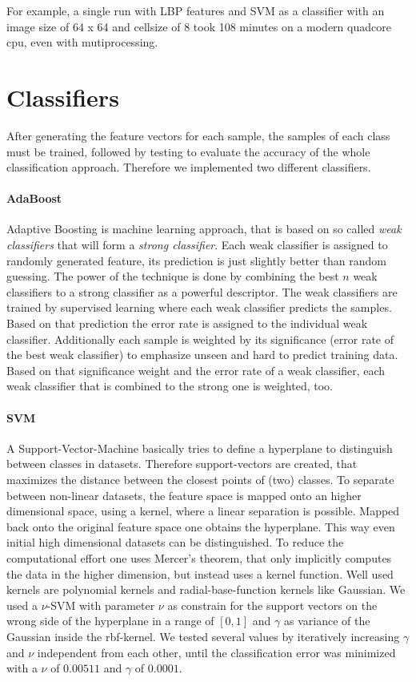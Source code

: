\documentclass[a4paper,10pt]{article}
\begin{document}
For example, a single run with LBP features and SVM as a classifier with an image size of 64 x 64 and cellsize of 8 took 108 minutes on a modern quadcore cpu, even with mutiprocessing.
\section{Classifiers}

After generating the feature vectors for each sample, the samples of each class must be trained, followed by testing to evaluate the accuracy of the whole classification approach. 
Therefore we implemented two different classifiers. 

\paragraph{AdaBoost}
Adaptive Boosting \cite{Fre95} is machine learning approach, that is based on so called \textit{weak classifiers} that will form a \textit{strong classifier}. Each weak classifier is assigned to randomly generated feature, its prediction is just slightly better than random guessing. The power of the technique is done by combining the best $n$ weak classifiers to a strong classifier as a powerful descriptor. The weak classifiers are trained by supervised learning where each weak classifier predicts the samples. Based on that prediction the error rate is assigned to the individual weak classifier. Additionally each sample is weighted by its significance (error rate of the best weak classifier) to emphasize unseen and hard to predict training data. Based on that significance weight and the error rate of a weak classifier, each weak classifier that is combined to the strong one is weighted, too.
\paragraph{SVM}
A Support-Vector-Machine basically tries to define a hyperplane to distinguish between classes in datasets. Therefore support-vectors are created, that maximizes the distance between the closest points of (two) classes. To separate between non-linear datasets, the feature space is mapped onto an higher dimensional space, using a kernel, where a linear separation is possible. Mapped back onto the original feature space one obtains the hyperplane. This way even initial high dimensional datasets can be distinguished. To reduce the computational effort one uses Mercer's theorem, that only implicitly computes the data in the higher dimension, but instead uses a kernel function. Well used kernels are polynomial kernels and radial-base-function kernels like Gaussian. We used a $\nu$-SVM with parameter $\nu$ as constrain for the support vectors on the wrong side of the hyperplane in a range of $[0,1]$ and $\gamma$ as variance of the Gaussian inside the rbf-kernel. We tested several values by iteratively increasing $\gamma$ and $\nu$ independent from each other, until the classification error was minimized with a $\nu$ of $0.00511$ and $\gamma$ of $0.0001$.
\end{document}
